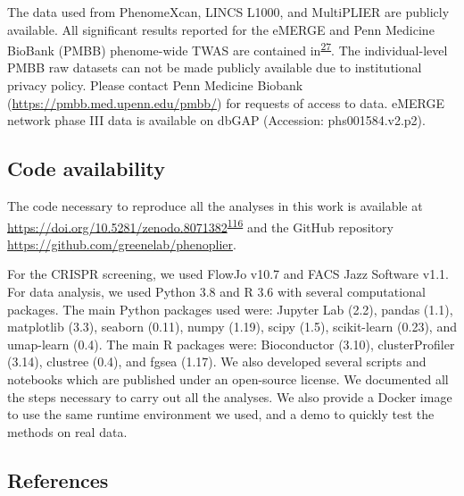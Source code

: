 \documentclass[
  a4paper,
]{article}
\begin{document}
The data used from PhenomeXcan, LINCS L1000, and MultiPLIER are publicly available.
All significant results reported for the eMERGE and Penn Medicine BioBank (PMBB) phenome-wide TWAS are contained in\textsuperscript{\protect\hyperlink{ref-gZAOkumx}{27}}.
The individual-level PMBB raw datasets can not be made publicly available due to institutional privacy policy.
Please contact Penn Medicine Biobank (\url{https://pmbb.med.upenn.edu/pmbb/}) for requests of access to data.
eMERGE network phase III data is available on dbGAP (Accession: phs001584.v2.p2).

\hypertarget{code-availability}{%
\subsection{Code availability}\label{code-availability}}

The code necessary to reproduce all the analyses in this work is available at \url{https://doi.org/10.5281/zenodo.8071382}\textsuperscript{\protect\hyperlink{ref-cygmsEBt}{116}} and the GitHub repository \url{https://github.com/greenelab/phenoplier}.

For the CRISPR screening, we used FlowJo v10.7 and FACS Jazz Software v1.1.
For data analysis, we used Python 3.8 and R 3.6 with several computational packages.
The main Python packages used were: Jupyter Lab (2.2), pandas (1.1), matplotlib (3.3), seaborn (0.11), numpy (1.19), scipy (1.5), scikit-learn (0.23), and umap-learn (0.4).
The main R packages were: Bioconductor (3.10), clusterProfiler (3.14), clustree (0.4), and fgsea (1.17).
We also developed several scripts and notebooks which are published under an open-source license.
We documented all the steps necessary to carry out all the analyses.
We also provide a Docker image to use the same runtime environment we used, and a demo to quickly test the methods on real data.

\hypertarget{references}{%
\subsection{References}\label{references}}
\end{document}
